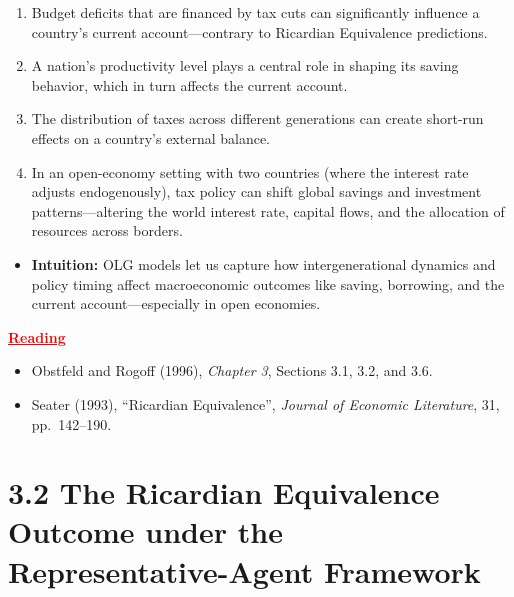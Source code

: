 \documentclass[12pt]{article}
\begin{document}
\begin{enumerate}
\item Budget deficits that are financed by tax cuts can significantly influence a country's current account—contrary to Ricardian Equivalence predictions.

\item A nation's productivity level plays a central role in shaping its saving behavior, which in turn affects the current account.

\item The distribution of taxes across different generations can create short-run effects on a country's external balance.

\item In an open-economy setting with two countries (where the interest rate adjusts endogenously), tax policy can shift global savings and investment patterns—altering the world interest rate, capital flows, and the allocation of resources across borders.
\end{enumerate}

\begin{itemize}
\item \textbf{Intuition:} OLG models let us capture how intergenerational dynamics and policy timing affect macroeconomic outcomes like saving, borrowing, and the current account—especially in open economies.
\end{itemize}

\begin{center}
\textcolor{red}{\underline{\textbf{Reading}}}
\end{center}

\begin{itemize}
\item Obstfeld and Rogoff (1996), \textit{Chapter 3}, Sections 3.1, 3.2, and 3.6.

\item Seater (1993), ``Ricardian Equivalence'', \textit{Journal of Economic Literature}, 31, pp.~142–190.
\end{itemize}

\section*{\noindent\textbf{3.2 The Ricardian Equivalence Outcome under the \\ 
Representative-Agent Framework}}
\end{document}
